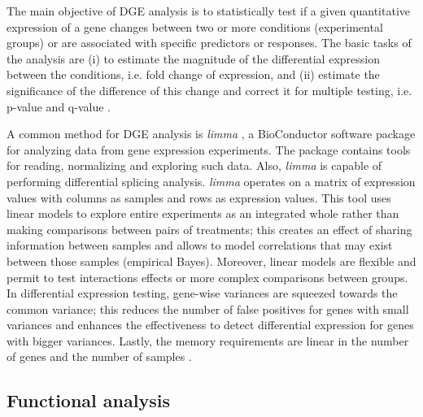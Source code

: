 The main objective of DGE analysis is to statistically test if a given quantitative expression of a gene changes between two or more conditions (experimental groups) or are associated with specific predictors or responses. The basic tasks of the analysis are (i) to estimate the magnitude of the differential expression between the conditions, i.e. fold change of expression, and (ii) estimate the significance of the difference of this change and correct it for multiple testing, i.e. p-value and q-value \cite{dundar}.

A common method for DGE analysis is \textit{limma} \cite{Ritchie}, a BioConductor software package for analyzing data from gene expression experiments. The package contains tools for reading, normalizing and exploring such data. Also, \textit{limma} is capable of performing differential splicing analysis. \textit{limma} operates on a matrix of expression values with columns as samples and rows as expression values. This tool uses linear models to explore entire experiments as an integrated whole rather than making comparisons between pairs of treatments; this creates an effect of sharing information between samples and allows to model correlations that may exist between those samples (empirical Bayes). Moreover, linear models are flexible and permit to test interactions effects or more complex comparisons between groups. In differential expression testing, gene-wise variances are squeezed towards the common variance; this reduces the number of false positives for genes with small variances and enhances the effectiveness to detect differential expression for genes with bigger variances. Lastly, the memory requirements are linear in the number of genes and the number of samples \cite{Ritchie}.

\subsection{Functional analysis}

